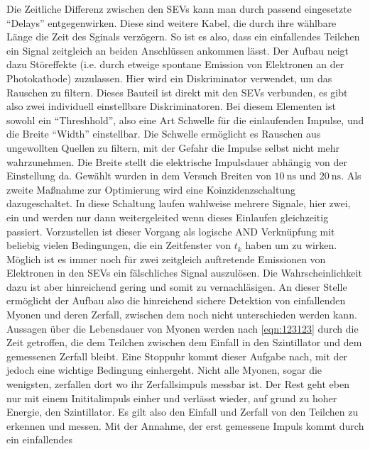 \vspace{0.5cm}
Die Zeitliche Differenz zwischen den SEVs kann man durch passend eingesetzte \enquote{Delays} entgegenwirken. Diese sind weitere Kabel, 
die durch ihre wählbare Länge die Zeit des Sginals verzögern. So ist es also, dass ein einfallendes Teilchen ein Signal zeitgleich an beiden Anschlüssen ankommen lässt.
Der Aufbau neigt dazu Störeffekte (i.e. durch etweige spontane Emission von Elektronen an der Photokathode) zuzulassen. Hier wird ein Diskriminator verwendet, um das Rauschen zu filtern.
Dieses Bauteil ist direkt mit den SEVs verbunden, es gibt also zwei individuell einstellbare Diskriminatoren.
Bei diesem Elementen ist sowohl ein \enquote{Threshhold}, also eine Art Schwelle für die einlaufenden Impulse, und die Breite \enquote{Width} einstellbar.
Die Schwelle ermöglicht es Rauschen aus ungewollten Quellen zu filtern, mit der Gefahr die Impulse selbst nicht mehr wahrzunehmen. 
Die Breite stellt die elektrische Impulsdauer abhängig von der Einstellung da. Gewählt wurden in dem Versuch Breiten von $\SI{10}{\nano\second}$ und $\SI{20}{\nano\second}$.
Als zweite Maßnahme zur Optimierung wird eine Koinzidenzschaltung dazugeschaltet. 
In diese Schaltung laufen wahlweise mehrere Signale, hier zwei, ein und werden nur dann weitergeleited wenn dieses Einlaufen gleichzeitig passiert.
Vorzustellen ist dieser Vorgang als logische AND Verknüpfung mit beliebig vielen Bedingungen, die ein Zeitfenster von $t_k$ haben um zu wirken. 
\\
\newline
Möglich ist es immer noch für zwei zeitgleich auftretende Emissionen von Elektronen in den SEVs ein fälschliches Signal auszulösen. Die Wahrscheinlichkeit dazu ist aber hinreichend gering
und somit zu vernachläsigen. An dieser Stelle ermöglicht der Aufbau also die hinreichend sichere Detektion von einfallenden Myonen und deren Zerfall, 
zwischen dem noch nicht unterschieden werden kann. 
\\
\newline
Aussagen über die Lebensdauer von Myonen werden nach \eqref{eqn:123123} durch die Zeit getroffen, die dem Teilchen zwischen dem Einfall in den Szintillator und dem gemessenen 
Zerfall bleibt. Eine Stoppuhr kommt dieser Aufgabe nach, mit der jedoch eine wichtige Bedingung einhergeht. 
Nicht alle Myonen, sogar die wenigsten, zerfallen dort wo ihr Zerfallsimpuls messbar ist. Der Rest geht eben nur mit einem Inititalimpuls einher und verlässt wieder, auf grund zu hoher Energie, den Szintillator.
Es gilt also den Einfall und Zerfall von den Teilchen zu erkennen und messen. Mit der Annahme, der erst gemessene Impuls kommt durch ein einfallendes 
